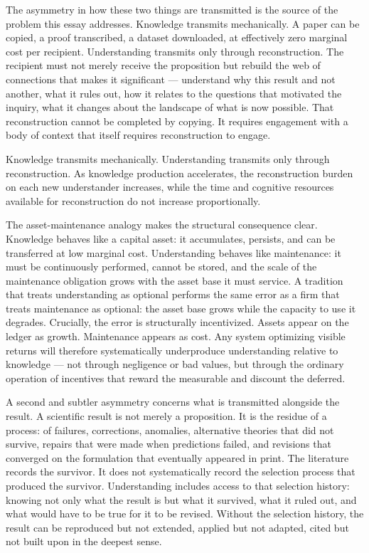 The asymmetry in how these two things are transmitted is the source of the
problem this essay addresses. Knowledge transmits mechanically. A paper can be
copied, a proof transcribed, a dataset downloaded, at effectively zero marginal
cost per recipient. Understanding transmits only through reconstruction. The
recipient must not merely receive the proposition but rebuild the web of
connections that makes it significant --- understand why this result and not
another, what it rules out, how it relates to the questions that motivated
the inquiry, what it changes about the landscape of what is now possible.
That reconstruction cannot be completed by copying. It requires engagement
with a body of context that itself requires reconstruction to engage.

\begin{principle}
Knowledge transmits mechanically. Understanding transmits only through
reconstruction. As knowledge production accelerates, the reconstruction
burden on each new understander increases, while the time and cognitive
resources available for reconstruction do not increase proportionally.
\end{principle}

The asset-maintenance analogy makes the structural consequence clear. Knowledge
behaves like a capital asset: it accumulates, persists, and can be transferred
at low marginal cost. Understanding behaves like maintenance: it must be
continuously performed, cannot be stored, and the scale of the maintenance
obligation grows with the asset base it must service. A tradition that treats
understanding as optional performs the same error as a firm that treats
maintenance as optional: the asset base grows while the capacity to use it
degrades. Crucially, the error is structurally incentivized. Assets appear
on the ledger as growth. Maintenance appears as cost. Any system optimizing
visible returns will therefore systematically underproduce understanding
relative to knowledge --- not through negligence or bad values, but through
the ordinary operation of incentives that reward the measurable and discount
the deferred.

A second and subtler asymmetry concerns what is transmitted alongside the
result. A scientific result is not merely a proposition. It is the residue
of a process: of failures, corrections, anomalies, alternative theories
that did not survive, repairs that were made when predictions failed, and
revisions that converged on the formulation that eventually appeared in print.
The literature records the survivor. It does not systematically record the
selection process that produced the survivor. Understanding includes access
to that selection history: knowing not only what the result is but what it
survived, what it ruled out, and what would have to be true for it to be
revised. Without the selection history, the result can be reproduced but
not extended, applied but not adapted, cited but not built upon in the deepest
sense.

